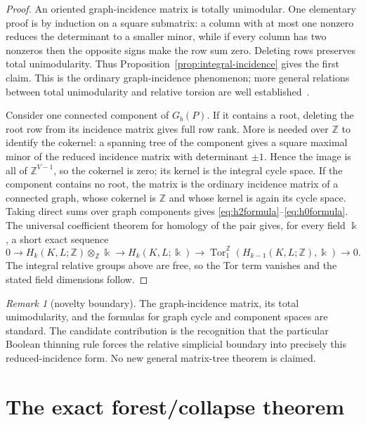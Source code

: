 \documentclass[11pt]{article}
\theoremstyle{definition}
\theoremstyle{remark}
\newtheorem{remark}[theorem]{Remark}
\newcommand{\Z}{\mathbb Z}
\begin{document}
\begin{proof}
An oriented graph-incidence matrix is totally unimodular.  One elementary proof is by
induction on a square submatrix: a column with at most one nonzero reduces the
determinant to a smaller minor, while if every column has two nonzeros then the
opposite signs make the row sum zero.  Deleting rows preserves total unimodularity.
Thus Proposition~\ref{prop:integral-incidence} gives the first claim.  This is the
ordinary graph-incidence phenomenon; more general relations between total
unimodularity and relative torsion are well established~\cite{DeyHiraniKrishnamoorthy2011}.

Consider one connected component of $G_b(P)$.  If it contains a root, deleting the
root row from its incidence matrix gives full row rank.  More is needed over $\Z$ to
identify the cokernel: a spanning tree of the component gives a square maximal minor
of the reduced incidence matrix with determinant $\pm1$.  Hence the image is all of
$\Z^{V-1}$, so the cokernel is zero; its kernel is the integral cycle space.  If the
component contains no root, the matrix is the ordinary incidence matrix of a connected
graph, whose cokernel is $\Z$ and whose kernel is again its cycle space.  Taking direct sums over graph components gives
\eqref{eq:h2formula}--\eqref{eq:h0formula}.  The universal coefficient theorem for
homology of the pair gives, for every field $\Bbbk$, a short exact sequence
\[
  0\longrightarrow H_k(K,L;\Z)\otimes_{\Z}\Bbbk
  \longrightarrow H_k(K,L;\Bbbk)
  \longrightarrow \operatorname{Tor}^{\Z}_1(H_{k-1}(K,L;\Z),\Bbbk)
  \longrightarrow0.
\]
The integral relative groups above are free, so the Tor term vanishes and the stated
field dimensions follow.
\end{proof}

\begin{remark}[novelty boundary]
The graph-incidence matrix, its total unimodularity, and the formulas for graph cycle
and component spaces are standard.  The candidate contribution is the recognition
that the particular Boolean thinning rule forces the relative simplicial boundary
into precisely this reduced-incidence form.  No new general matrix-tree theorem is
claimed.
\end{remark}

\section{The exact forest/collapse theorem}\label{sec:forest}
\end{document}
